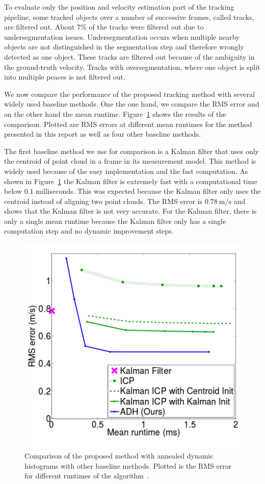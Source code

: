 \documentclass[twoside,a4paper,article]{combine}
\begin{document}
To evaluate only the position and velocity estimation part of the
tracking pipeline, some tracked objects over a number of successive
frames, called tracks, are filtered out. About $7\%$ of the tracks
were filtered out due to undersegmentation issues. Undersegmentation
occurs when multiple nearby objects are not distinguished in the
segmentation step and therefore wrongly detected as one object. These
tracks are filtered out because of the ambiguity in the ground-truth
velocity. Tracks with oversegmentation, where one object is split into
multiple peaces is not filtered out.

We now compare the performance of the proposed tracking method with
several widely used baseline methods. One the one hand, we compare the
RMS error and on the other hand the mean runtime.
Figure~\ref{fig:rms-runtime} shows the results of the
comparison. Plotted are RMS errors at different mean runtimes for the
method presented in this report as well as four other baseline methods.

The first baseline method we use for comparison is a Kalman filter that
uses only the centroid of point cloud in a frame in its measurement
model. This method is widely used because of the easy implementation
and the fast computation. As shown in Figure~\ref{fig:rms-runtime} the
Kalman filter is extremely fast with a computational time below $0.1$
milliseconds. This was expected because the Kalman filter only uses
the centroid instead of aligning two point clouds. The RMS error is
$0.78 \mathrm{~m/s}$ and shows that the Kalman filter is not very
accurate. For the Kalman filter, there is only a single mean runtime
because the Kalman filter only has a single computation step and no
dynamic improvement steps.

\begin{figure}
  \center
  \includegraphics[width=.45\linewidth]{rms-vs-runtime}
  \caption{Comparison of the proposed method with annealed dynamic
    histograms with other baseline methods. Plotted is the RMS error
    for different runtimes of the algorithm~\cite{paper}.}
  \label{fig:rms-runtime}
\end{figure}
\end{document}
